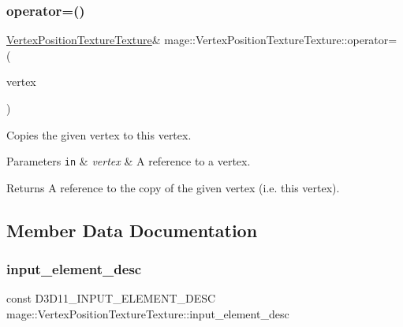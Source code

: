 \subsubsection{\texorpdfstring{operator=()}{operator=()}}
{\footnotesize\ttfamily \hyperlink{structmage_1_1_vertex_position_texture_texture}{Vertex\+Position\+Texture\+Texture}\& mage\+::\+Vertex\+Position\+Texture\+Texture\+::operator= (\begin{DoxyParamCaption}\item[{const \hyperlink{structmage_1_1_vertex_position_texture_texture}{Vertex\+Position\+Texture\+Texture} \&}]{vertex }\end{DoxyParamCaption})\hspace{0.3cm}{\ttfamily [default]}}

Copies the given vertex to this vertex.


\begin{DoxyParams}[1]{Parameters}
\mbox{\tt in}  & {\em vertex} & A reference to a vertex. \\
\hline
\end{DoxyParams}
\begin{DoxyReturn}{Returns}
A reference to the copy of the given vertex (i.\+e. this vertex). 
\end{DoxyReturn}


\subsection{Member Data Documentation}
\hypertarget{structmage_1_1_vertex_position_texture_texture_a82f271622e34a209d7a3918e7a0190e4}{}\label{structmage_1_1_vertex_position_texture_texture_a82f271622e34a209d7a3918e7a0190e4} 
\subsubsection{\texorpdfstring{input\+\_\+element\+\_\+desc}{input\_element\_desc}}
{\footnotesize\ttfamily const D3\+D11\+\_\+\+I\+N\+P\+U\+T\+\_\+\+E\+L\+E\+M\+E\+N\+T\+\_\+\+D\+E\+SC mage\+::\+Vertex\+Position\+Texture\+Texture\+::input\+\_\+element\+\_\+desc\hspace{0.3cm}{\ttfamily [static]}}


